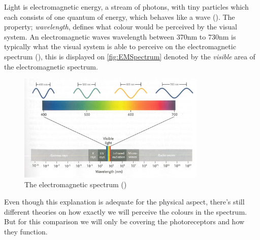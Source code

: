 \documentclass{article}
\newcommand{\goodcite}[1]{ {(\cite{#1})}}
\begin{document}
Light is electromagnetic energy, a stream of photons, with tiny particles which each consists of one quantum of energy, which behaves like a wave\goodcite{hsp}. The property; \textit{wavelength}, defines what colour would be perceived by the visual system. An electromagnetic waves wavelength between 370nm to 730nm is typically what the visual system is able to perceive on the electromagnetic spectrum\goodcite{hsp}, this is displayed on \autoref{fig:EMSpectrum} denoted by the \textit{visible} area of the electromagnetic spectrum.
\begin{figure}[H]
  \centering
  \includegraphics[width=0.8\textwidth]{img/EMSpectrum.jpg}
  \caption{The electromagnetic spectrum\goodcite{hsp}}
  \label{fig:EMSpectrum}
\end{figure}
Even though this explanation is adequate for the physical aspect, there's still different theories on how exactly we will perceive the colours in the spectrum. But for this comparison we will only be covering the photoreceptors and how they function.%


\end{document}
